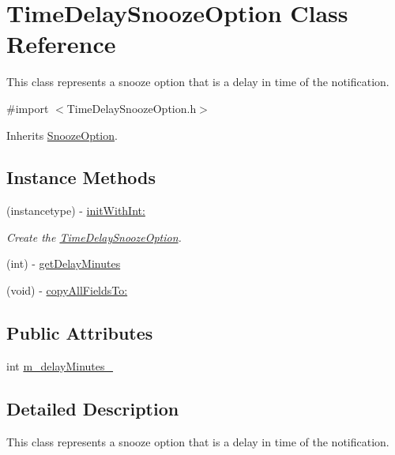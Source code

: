 \hypertarget{interface_time_delay_snooze_option}{}\section{Time\+Delay\+Snooze\+Option Class Reference}
\label{interface_time_delay_snooze_option}


This class represents a snooze option that is a delay in time of the notification.  




{\ttfamily \#import $<$Time\+Delay\+Snooze\+Option.\+h$>$}



Inherits \hyperlink{interface_snooze_option}{Snooze\+Option}.

\subsection*{Instance Methods}
\begin{DoxyCompactItemize}
\item 
(instancetype) -\/ \hyperlink{interface_time_delay_snooze_option_a9fbe11b71582cbd6683bfd8c383e33da}{init\+With\+Int\+:}
\begin{DoxyCompactList}\small\item\em Create the \hyperlink{interface_time_delay_snooze_option}{Time\+Delay\+Snooze\+Option}. \end{DoxyCompactList}\item 
(int) -\/ \hyperlink{interface_time_delay_snooze_option_ad7a6c3091db9281e725331f9746b2eaf}{get\+Delay\+Minutes}
\item 
(void) -\/ \hyperlink{interface_time_delay_snooze_option_af0f0f6a40c8e564cd4d9e13d20be2333}{copy\+All\+Fields\+To\+:}
\end{DoxyCompactItemize}
\subsection*{Public Attributes}
\begin{DoxyCompactItemize}
\item 
int \hyperlink{interface_time_delay_snooze_option_a0df442daead3f5ec2b81ff8447043aa2}{m\+\_\+delay\+Minutes\+\_\+}
\end{DoxyCompactItemize}


\subsection{Detailed Description}
This class represents a snooze option that is a delay in time of the notification. 

